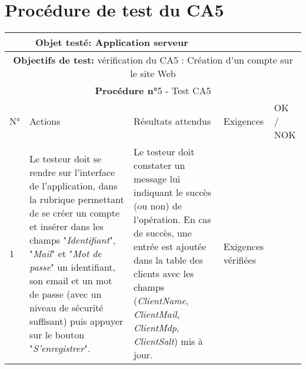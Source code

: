 \section*{Procédure de test du CA5}
\begin{table}[!h]
        \centering
        \begin{tabular}{|m{0.6cm}|
                         >{\raggedright\arraybackslash}m{4cm}|
                         >{\raggedright\arraybackslash}m{6.4cm}|
                         >{\raggedright\arraybackslash}m{2cm}|
                         m{1cm}|}
            \hline
            \multicolumn{3}{|c|}{
                \textbf{Objet testé: } Application serveur
            } & \multicolumn{2}{|c|}{
                \textbf{Version: } version    
            } \\
            \hline
            \multicolumn{5}{|c|}{\textbf{Objectifs de test:}
                vérification du CA5 : Création d'un compte sur le site Web} \\
            \hline
            \multicolumn{5}{|c|}{
                \textbf{Procédure n°}5 - Test CA5
            } \\
            \hline
            N° & Actions & Résultats attendus & Exigences & OK / NOK \\
            \hline      %
            1 & Le testeur doit se rendre sur l'interface de l'application,
                dans la rubrique permettant de se créer un compte et insérer
                dans les champs "\emph{Identifiant}", "\emph{Mail}" et 
                "\emph{Mot de passe}" un identifiant, son email et un mot de 
                passe (avec un niveau de sécurité suffisant) puis appuyer sur
                le bouton "\emph{S'enregistrer}".
              & Le testeur doit constater un message lui indiquant le succès (ou non)
                de l'opération. En cas de succès, une entrée est ajoutée dans la table 
                des clients avec les champs (\emph{ClientName}, \emph{ClientMail}, 
                \emph{ClientMdp}, \emph{ClientSalt}) mis à jour. 
              & Exigences vérifiées & \\
            \hline
        \end{tabular} 
        \label{tab:tab5}
\end{table}
\newpage

